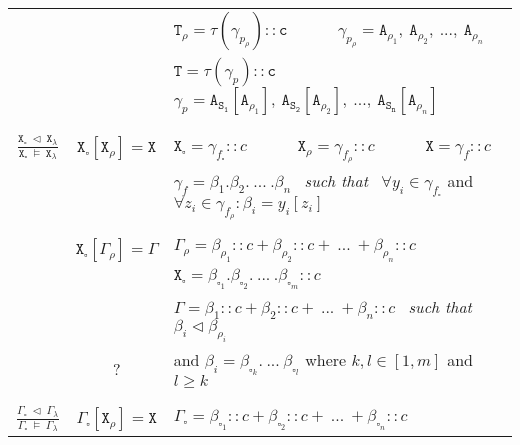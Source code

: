 \documentclass{entcs}
\renewcommand{\~}[0]{\texttildelow}
\begin{document}
\begin{defn}
\begin{center}
{\begin{tabular}{ c | | c | l }
     &  & $ \mathtt{T}_\rho = \tau(\gamma_{p_\rho})::\mathtt{c}$ ~~~~~ $ \gamma_{p_\rho} = \mathtt{A}_{\rho_1}, ~\mathtt{A}_{\rho_2}, ~..., ~\mathtt{A}_{\rho_n} $ \\
     &  & $\mathtt{T} = \tau(\gamma_{p})::\mathtt{c} $ ~~~~~ $\gamma_{p} = \mathtt{A}_\mathtt{S_1}[\mathtt{A}_{\rho_1}],~\mathtt{A}_\mathtt{S_2}[\mathtt{A}_{\rho_2}],~... ,~\mathtt{A}_\mathtt{S_n}[\mathtt{A}_{\rho_n}]$ \\

    & & \\[0.02cm]
    \hline
    & & \\[0.02cm]

    $\frac{\mathtt{X}_{\square}~\lhd~\mathtt{X}_{\lambda}}{\mathtt{X}_{\square}~\models~\mathtt{X}_{\lambda}}$ & 
    $ \mathtt{X}_{\square}[\mathtt{X}_\rho] = \mathtt{X} $ & 
    $ \mathtt{X}_{\square} = \gamma_{f_{\square}}::c$ ~~~~~ $ \mathtt{X}_\rho = \gamma_{f_\rho}::c $ ~~~~~ $ \mathtt{X} = \gamma_{f}::c $\\

     &  & $\gamma_{f} = \beta_1.\beta_2.~...~.\beta_n $~ \emph{such that} ~$ \forall y_i \in \gamma_{f_{\square}}$ and $ \forall z_i \in \gamma_{f_\rho} : \beta_i = y_i[z_i]$ \\

	& & \\[0.02cm]
    \hline
    & & \\[0.02cm]

     & 
    $ \mathtt{X}_{\square}[\Gamma_\rho] = \Gamma $ & 
    $ \Gamma_\rho = \beta_{\rho_1}::c + \beta_{\rho_2}::c + ~...~+ \beta_{\rho_n}::c $ \\

	 &  & $ \mathtt{X}_{\square} = \beta_{\square_1}.\beta_{\square_2}.~...~.\beta_{\square_m}::c $\\

     &  & $ \Gamma = \beta_1::c + \beta_2::c + ~...~+ \beta_n::c $~ \emph{such that} ~$ \beta_i \lhd \beta_{\rho_i}$ \\

     & ? & and $ \beta_i = \beta_{\square_k}.~...~\beta_{\square_l}$ where $k, l \in [1, m]$ and $l \geq k $\\

    & & \\[0.02cm]
    \hline
    & & \\[0.02cm]

	$ \frac{\Gamma_{\square}~\lhd~\Gamma_\lambda}{\Gamma_{\square}~\models~\Gamma_\lambda} $ & 
    $ \Gamma_{\square}[\mathtt{X}_\rho] = \mathtt{X} $ & 
    $ \Gamma_{\square} = \beta_{\square_1}::c + \beta_{\square_2}::c + ~...~+ \beta_{\square_n}::c $\\


\end{tabular}}
\end{center}
\end{defn}
\end{document}
